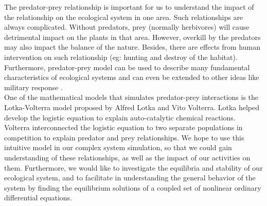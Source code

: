 \documentclass{article}
\begin{document}
\begin{normalsize}
		The predator-prey relationship is important for us to understand the impact of the relationship on the ecological system in one area. Such relationships are always complicated. Without predators, prey (normally herbivores) will cause detrimental impact on the plants in that area. However, overkill by the predators may also impact the balance of the nature. Besides, there are effects from human intervention on such relationship (eg: hunting and destroy of the habitat). Furthermore, predator-prey model can be used to describe many fundamental characteristics of ecological systems and can even be extended to other ideas like military response \cite{derrik}.\\
		
		One of the mathematical models that simulates predator-prey interactions is the Lotka-Volterra model proposed by Alfred Lotka and Vito Volterra. Lotka helped develop the logistic equation to explain auto-catalytic chemical reactions. Volterra interconnected the logistic equation to two separate populations in competition to explain predator and prey relationships. We hope to use this intuitive model in our complex system simulation, so that we could gain understanding of these relationships, as well as the impact of our activities on them. Furthermore, we would like to investigate the equilibria and stability of our ecological system, and to facilitate in understanding the general behavior of the system by finding the equilibrium solutions of a coupled set of nonlinear ordinary differential equations.\cite{tung_2007_topics}\cite{a2018_alfred}

\end{normalsize}
\end{document}
